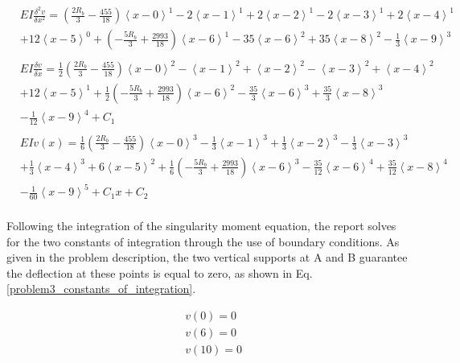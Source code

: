 \documentclass[a4paper]{article}
\begin{document}
\begin{equation}
    \begin{split}
& EI \frac{\delta^2 v}{\delta x^2} = \left(\frac{2R_b}{3} - \frac{455}{18}\right)\left<x-0\right>^1 - 2\left<x-1\right>^1 +  2\left<x-2\right>^1 - 2\left<x-3\right>^1 +  2\left<x-4\right>^1 \\
& + 12\left<x-5\right>^0 + \left(-\frac{5R_b}{3} + \frac{2993}{18}\right)\left<x-6\right>^1 - 35\left<x-6\right>^2 + 35\left<x-8\right>^2  - \frac{1}{3}\left<x-9\right>^3 \\
& \\
& EI \frac{\delta v}{\delta x} = \frac{1}{2}\left(\frac{2R_b}{3} - \frac{455}{18}\right)\left<x-0\right>^2 - \left<x-1\right>^2 +  \left<x-2\right>^2 - \left<x-3\right>^2 +  \left<x-4\right>^2 \\
& + 12\left<x-5\right>^1 + \frac{1}{2}\left(-\frac{5R_b}{3} + \frac{2993}{18}\right)\left<x-6\right>^2 -  \frac{35}{3}\left<x-6\right>^3 + \frac{35}{3}\left<x-8\right>^3  \\
& - \frac{1}{12}\left<x-9\right>^4 + C_1 \\
& \\
& EI v(x) =\frac{1}{6}\left(\frac{2R_b}{3} - \frac{455}{18}\right)\left<x-0\right>^3 - \frac{1}{3}\left<x-1\right>^3 +  \frac{1}{3}\left<x-2\right>^3 - \frac{1}{3}\left<x-3\right>^3 \\
& +  \frac{1}{3}\left<x-4\right>^3 + 6\left<x-5\right>^2 + \frac{1}{6}\left(-\frac{5R_b}{3} + \frac{2993}{18}\right)\left<x-6\right>^3 -  \frac{35}{12}\left<x-6\right>^4 + \frac{35}{12}\left<x-8\right>^4  \\
& - \frac{1}{60}\left<x-9\right>^5 + C_1x + C_2 \\
\end{split}
\label{problem3_equations}
\end{equation}

Following the integration of the singularity moment equation, the report solves for the two constants of integration through the use of boundary conditions. As given in the problem description, the two vertical supports at A and B guarantee the deflection at these points is equal to zero, as shown in Eq. \ref{problem3_constants_of_integration}.

\begin{equation}
\begin{split}
	& v(0) = 0 \\
	& v(6) = 0 \\
	& v(10) = 0 \\
\end{split}
\label{problem3_constants_of_integration}
\end{equation}
\end{document}
